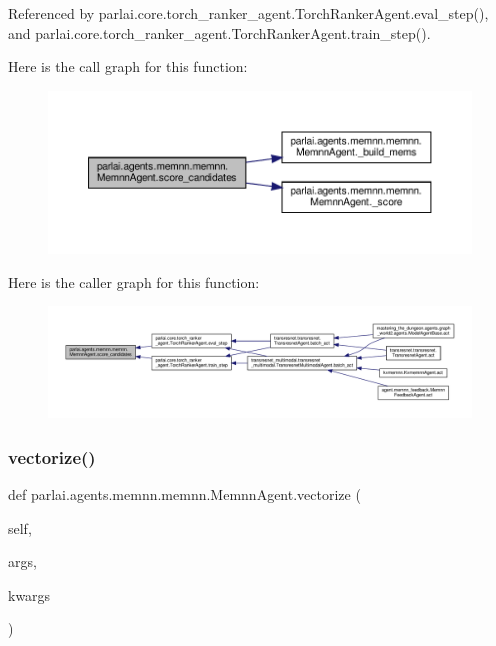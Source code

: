 Referenced by parlai.\+core.\+torch\+\_\+ranker\+\_\+agent.\+Torch\+Ranker\+Agent.\+eval\+\_\+step(), and parlai.\+core.\+torch\+\_\+ranker\+\_\+agent.\+Torch\+Ranker\+Agent.\+train\+\_\+step().

Here is the call graph for this function\+:
\nopagebreak
\begin{figure}[H]
\begin{center}
\leavevmode
\includegraphics[width=350pt]{classparlai_1_1agents_1_1memnn_1_1memnn_1_1MemnnAgent_a10b5418eda4da7bc85913e24e5b5a029_cgraph}
\end{center}
\end{figure}
Here is the caller graph for this function\+:
\nopagebreak
\begin{figure}[H]
\begin{center}
\leavevmode
\includegraphics[width=350pt]{classparlai_1_1agents_1_1memnn_1_1memnn_1_1MemnnAgent_a10b5418eda4da7bc85913e24e5b5a029_icgraph}
\end{center}
\end{figure}
\mbox{\label{classparlai_1_1agents_1_1memnn_1_1memnn_1_1MemnnAgent_a4c2d3c0bb7d0b78b1c6aa91eca8dd24e}} 
\subsubsection{\texorpdfstring{vectorize()}{vectorize()}}
{\footnotesize\ttfamily def parlai.\+agents.\+memnn.\+memnn.\+Memnn\+Agent.\+vectorize (\begin{DoxyParamCaption}\item[{}]{self,  }\item[{}]{args,  }\item[{}]{kwargs }\end{DoxyParamCaption})}

